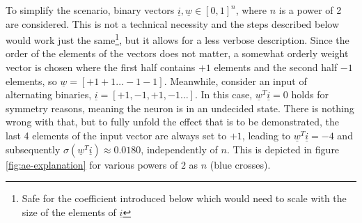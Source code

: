 \documentclass[11pt, a4paper]{article}
\newcommand\braces[1]{\left(#1\right)}
\newcommand\brackets[1]{\left[#1\right]}
\renewcommand{\vec}[1]{\underline{#1}}
\begin{document}
To simplify the scenario, binary vectors $\vec{i}, \vec{w} \in \brackets{0,1}^n$, where $n$ is a power of 2 are considered. This is not a technical necessity and the steps described below would work just the same\footnote{Safe for the coefficient introduced below which would need to scale with the size of the elements of $\vec{i}$}, but it allows for a less verbose description. Since the order of the elements of the vectors does not matter, a somewhat orderly weight vector is chosen where the first half contains $+1$ elements and the second half $-1$ elements, so $\vec{w} = \brackets{+1 +1 \dots -1 -1}$. Meanwhile, consider an input of alternating binaries, $\vec{i} = \brackets{+1, -1, +1, -1 \dots}$. In this case, $\vec{w}^T \vec{i} = 0$ holds for symmetry reasons, meaning the neuron is in an undecided state. There is nothing wrong with that, but to fully unfold the effect that is to be demonstrated, the last 4 elements of the input vector are always set to $+1$, leading to $\vec{w}^T \vec{i} = -4$ and subsequently $\sigma \braces{\vec{w}^T \vec{i}} \approx 0.0180$, independently of $n$. This is depicted in figure \ref{fig:ae-explanation} for various powers of $2$ as $n$ (blue crosses).
\end{document}
